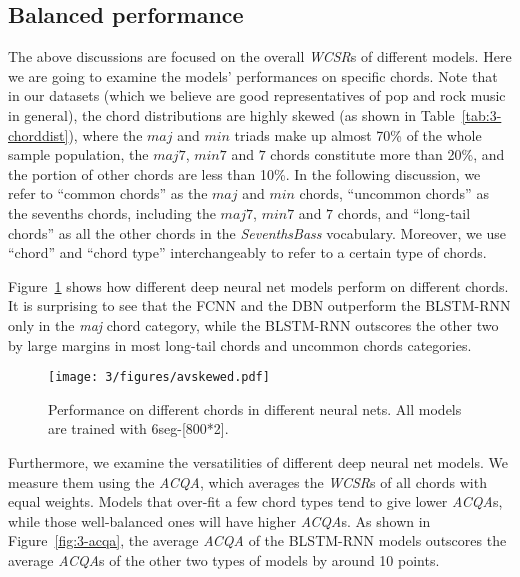 \subsection{Balanced performance}\label{sec:3-p7}
The above discussions are focused on the overall \textit{WCSR}s of different models. Here we are going to examine the models' performances on specific chords. Note that in our datasets (which we believe are good representatives of pop and rock music in general), the chord distributions are highly skewed (as shown in Table~\ref{tab:3-chorddist}), where the $maj$ and $min$ triads make up almost 70\% of the whole sample population, the $maj7$, $min7$ and $7$ chords constitute more than 20\%, and the portion of other chords are less than 10\%. In the following discussion, we refer to ``common chords'' as the $maj$ and $min$ chords, ``uncommon chords'' as the sevenths chords, including the $maj7$, $min7$ and $7$ chords, and ``long-tail chords'' as all the other chords in the \textit{SeventhsBass} vocabulary. Moreover, we use ``chord'' and ``chord type'' interchangeably to refer to a certain type of chords.

Figure~\ref{fig:3-skewed} shows how different deep neural net models perform on different chords. It is surprising to see that the FCNN and the DBN outperform the BLSTM-RNN only in the \textit{maj} chord category, while the BLSTM-RNN outscores the other two by large margins in most long-tail chords and uncommon chords categories.
\begin{figure}[h!]
	\centering
	\texttt{[image: 3/figures/avskewed.pdf]}
	\caption{Performance on different chords in different neural nets. All models are trained with 6seg-[800*2].}
	\label{fig:3-skewed}
\end{figure}

Furthermore, we examine the versatilities of different deep neural net models. We measure them using the \textit{ACQA}, which averages the \textit{WCSR}s of all chords with equal weights. Models that over-fit a few chord types tend to give lower \textit{ACQA}s, while those well-balanced ones will have higher \textit{ACQA}s. As shown in Figure~\ref{fig:3-acqa}, the average \textit{ACQA} of the BLSTM-RNN models outscores the average \textit{ACQA}s of the other two types of models by around 10 points.

